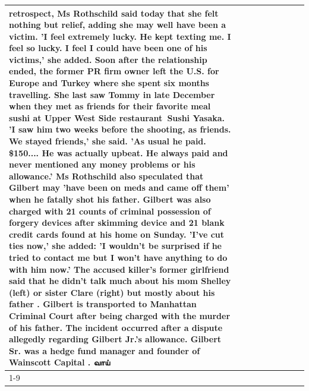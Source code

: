 \begin{table}[H]
\begin{tabular}{lllrlllll}
retrospect, Ms Rothschild said today that she felt nothing but relief, adding she may well have been a victim. 'I feel extremely lucky. He kept texting me. I feel so lucky. I feel I could have been one of his victims,' she added. Soon after the relationship ended, the former PR firm owner left the U.S. for Europe and Turkey where she spent six months  travelling. She last saw Tommy in late December when they met as friends for their favorite meal sushi at Upper West Side restaurant Sushi Yasaka. 'I saw him two weeks before the shooting, as friends. We stayed friends,' she said. 'As usual he paid. \$150.... He was actually upbeat. He always paid and never mentioned any money problems or his allowance.' Ms Rothschild also speculated that Gilbert may 'have been on meds and came off them' when he fatally shot his father. Gilbert was also charged with 21 counts of criminal possession of forgery devices after skimming device and 21 blank credit cards found at his home on Sunday. 'I've cut ties now,' she added: 'I wouldn’t be surprised if he tried to contact me but I won’t have anything to do with him now.' The accused killer's former girlfriend said that he didn't talk much about his mom Shelley (left) or sister Clare (right) but mostly about his father . Gilbert is transported to Manhattan Criminal Court  after being charged with the murder of his father. The incident occurred after a dispute allegedly regarding Gilbert Jr.'s allowance. Gilbert Sr. was a hedge fund manager and founder of Wainscott Capital . வாய் \\
\cline{1-9} \cline{2-9}

\end{tabular}
\end{table}
